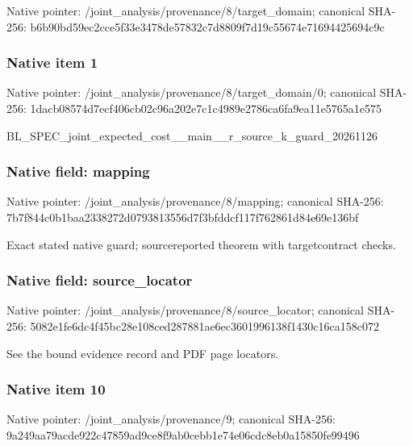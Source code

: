 \documentclass[10pt,a4paper]{article}
\begin{document}
Native pointer: /joint\_analysis/provenan\allowbreak{}ce/8/target\_domain; canonical SHA-256: b6b90bd59ec2cce5f33e3478\allowbreak{}de57832c7d8809f7d19c5567\allowbreak{}4e71694425694c9c



\subsubsection{Native item 1}


Native pointer: /joint\_analysis/provenan\allowbreak{}ce/8/target\_domain/0; canonical SHA-256: 1dacb08574d7ecf406cb02c9\allowbreak{}6a202e7c1c4989e2786ca6fa\allowbreak{}9ea11e5765a1e575


BL\_SPEC\_joint\_expected\_c\allowbreak{}ost\_\_main\_\_r\_source\_k\_gu\allowbreak{}ard\_20261126


\subsubsection{Native field: mapping}


Native pointer: /joint\_analysis/provenance/8/mapping; canonical SHA-256: 7b7f844c0b1baa2338272d07\allowbreak{}93813556d7f3bfddcf117f76\allowbreak{}2861d84e69e136bf


Exact stated native guard; sourcereported theorem with targetcontract checks.


\subsubsection{Native field: source\_locator}


Native pointer: /joint\_analysis/provenan\allowbreak{}ce/8/source\_locator; canonical SHA-256: 5082e1fe6dc4f45bc28e108c\allowbreak{}ed287881ae6ec3601996138f\allowbreak{}1430c16ca158c072


See the bound evidence record and PDF page locators.


\subsubsection{Native item 10}


Native pointer: /joint\_analysis/provenance/9; canonical SHA-256: 9a249aa79acde922c47859ad\allowbreak{}9ce8f9ab0cebb1e74e06cdc8\allowbreak{}eb0a15850fe99496
\end{document}
